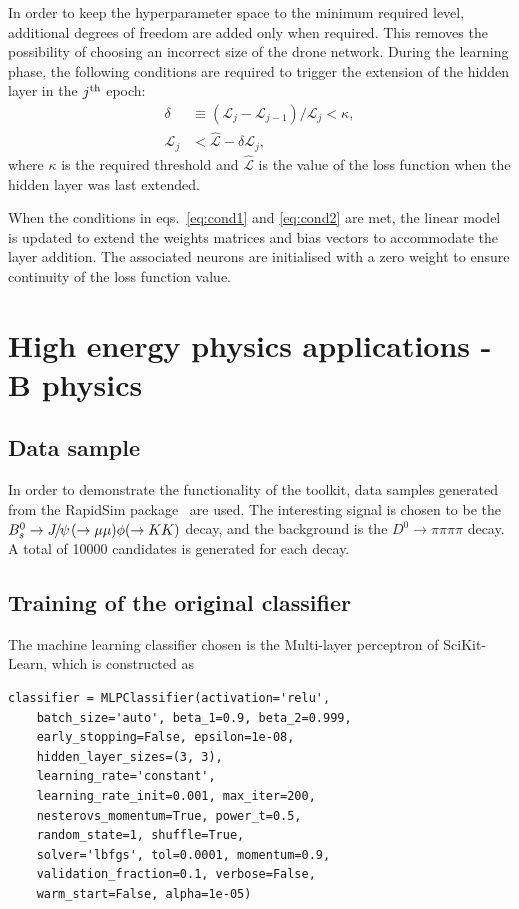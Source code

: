 \documentclass[final,5p,times,twocolumn]{elsarticle}
\def\Ppsi        {\ensuremath{\uppsi}\xspace}
\def\PB      {\ensuremath{\mathrm{B}}\xspace}
\def\PD      {\ensuremath{\mathrm{D}}\xspace}
\def\PJ      {\ensuremath{\mathrm{J}}\xspace}
\def\PK      {\ensuremath{\mathrm{K}}\xspace}
\def\Ps      {\ensuremath{\mathrm{s}}\xspace}
\def\Ppsi        {\ensuremath{\psi}\xspace}
\def\PB      {\ensuremath{B}\xspace}
\def\PD      {\ensuremath{D}\xspace}
\def\PJ      {\ensuremath{J}\xspace}
\def\PK      {\ensuremath{K}\xspace}
\def\Ps      {\ensuremath{s}\xspace}
\def\squark    {{\ensuremath{\Ps}}\xspace}
\def\D       {{\ensuremath{\PD}}\xspace}
\def\Dz      {{\ensuremath{\D^0}}\xspace}
\def\B       {{\ensuremath{\PB}}\xspace}
\def\Bs      {{\ensuremath{\B^0_\squark}}\xspace}
\def\jpsi     {{\ensuremath{{\PJ\mskip -3mu/\mskip -2mu\Ppsi\mskip 2mu}}}\xspace}
\def\to                 {\ensuremath{\rightarrow}\xspace}
\begin{document}
In order to keep the hyperparameter space to the minimum required level,
additional degrees of freedom are added only when required. 
This removes the possibility of choosing an incorrect size of the 
drone network. During the learning phase, the following conditions are required
to trigger the extension of the hidden layer in the $j^{\rm th}$ epoch:
\begin{align}
\delta &\equiv (\mathcal{L}_j-\mathcal{L}_{j-1})/\mathcal{L}_j < \kappa,\label{eq:cond1}\\ 
\mathcal{L}_j &< \hat{\mathcal{L}} - \delta\mathcal{L}_j \label{eq:cond2},
\end{align}
where $\kappa$ is the required threshold and $\hat{\mathcal{L}}$ is the value
of the loss function when the hidden layer was last extended.

When the conditions in eqs.~\ref{eq:cond1} and \ref{eq:cond2} are met, the linear model
is updated to extend the weights matrices and bias vectors
to accommodate the layer addition.
The associated neurons are initialised with a zero weight
to ensure continuity of the loss function value.


\section{High energy physics applications - B physics}
\label{sec:hepB}

\subsection{Data sample}

In order to demonstrate the functionality of the toolkit, data samples generated
from the RapidSim package~\cite{rapid} are used. The interesting signal is chosen
to be the $\Bs\to\jpsi(\to\mu\mu )\phi (\to\PK\PK )$ decay, and the background is
the $\Dz\to\pi\pi\pi\pi$ decay. A total of 10000 candidates is generated for each decay.

\subsection{Training of the original classifier}

The machine learning classifier chosen is the Multi-layer perceptron of SciKit-Learn,
which is constructed as
\begin{lstlisting}
classifier = MLPClassifier(activation='relu', 
    batch_size='auto', beta_1=0.9, beta_2=0.999, 
    early_stopping=False, epsilon=1e-08, 
    hidden_layer_sizes=(3, 3), 
    learning_rate='constant',
    learning_rate_init=0.001, max_iter=200,
    nesterovs_momentum=True, power_t=0.5, 
    random_state=1, shuffle=True,
    solver='lbfgs', tol=0.0001, momentum=0.9,
    validation_fraction=0.1, verbose=False,
    warm_start=False, alpha=1e-05)
\end{lstlisting}
\end{document}
